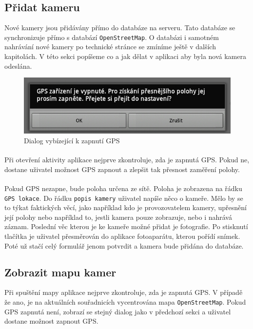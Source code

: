 \subsection{Přidat kameru}
Nové kamery jsou přidávány přímo do databáze na serveru. Tato databáze se synchronizuje přímo s databází \texttt{OpenStreetMap}. O databázi i samotném nahrávání nové kamery po technické stránce se zmíníme ještě v dalších kapitolách. V této sekci popíšeme co a jak dělat v aplikaci aby byla nová kamera odeslána.
\begin{figure}[!ht]
\begin{center}
\includegraphics[scale=0.2]{pics/open_GPS.jpg}
\caption{Dialog vybízející k zapnutí GPS}
\end{center}
\end{figure}
\paragraph{}
Při otevření aktivity  aplikace nejprve zkontroluje, zda je zapnutá GPS. Pokud ne, dostane uživatel možnost GPS zapnout a zlepšit tak přesnost zaměření polohy.
\paragraph{} Pokud GPS nezapne, bude poloha určena ze sítě. Poloha je zobrazena na řádku \texttt{GPS lokace}. Do řádku \texttt{popis kamery} uživatel napíše něco o kameře. Mělo by se to týkat faktických věcí, jako například kdo je provozovatelem kamery, upřesnění její polohy nebo například to, jestli kamera pouze zobrazuje, nebo i nahrává záznam. Poslední věc kterou je ke kameře možné přidat je fotografie. Po stisknutí tlačítka je uživatel přesměrován do aplikace fotoaparátu, kterou pořídí snímek. Poté už stačí celý formulář jenom potvrdit a kamera bude přidána do databáze.

\subsection{Zobrazit mapu kamer}
Při spuštění mapy aplikace nejprve zkontroluje, zda je zapnutá GPS. V případě že ano, je na aktuálních souřadnicích vycentrována mapa \texttt{OpenStreetMap}. Pokud GPS zapnutá není, zobrazí se stejný dialog jako v předchozí sekci a uživatel dostane možnost zapnout GPS.
